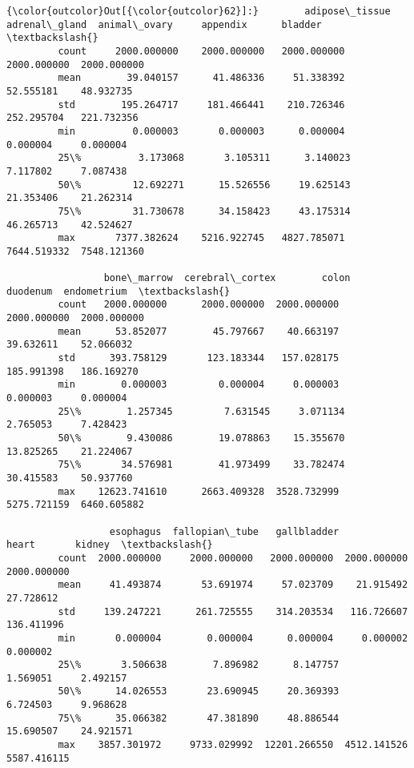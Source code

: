 \documentclass[11pt]{article}
\begin{document}
\begin{Verbatim}[commandchars=\\\{\}]
{\color{outcolor}Out[{\color{outcolor}62}]:}        adipose\_tissue  adrenal\_gland  animal\_ovary     appendix      bladder  \textbackslash{}
         count     2000.000000    2000.000000   2000.000000  2000.000000  2000.000000   
         mean        39.040157      41.486336     51.338392    52.555181    48.932735   
         std        195.264717     181.466441    210.726346   252.295704   221.732356   
         min          0.000003       0.000003      0.000004     0.000004     0.000004   
         25\%          3.173068       3.105311      3.140023     7.117802     7.087438   
         50\%         12.692271      15.526556     19.625143    21.353406    21.262314   
         75\%         31.730678      34.158423     43.175314    46.265713    42.524627   
         max       7377.382624    5216.922745   4827.785071  7644.519332  7548.121360   
         
                 bone\_marrow  cerebral\_cortex        colon     duodenum  endometrium  \textbackslash{}
         count   2000.000000      2000.000000  2000.000000  2000.000000  2000.000000   
         mean      53.852077        45.797667    40.663197    39.632611    52.066032   
         std      393.758129       123.183344   157.028175   185.991398   186.169270   
         min        0.000003         0.000004     0.000003     0.000003     0.000004   
         25\%        1.257345         7.631545     3.071134     2.765053     7.428423   
         50\%        9.430086        19.078863    15.355670    13.825265    21.224067   
         75\%       34.576981        41.973499    33.782474    30.415583    50.937760   
         max    12623.741610      2663.409328  3528.732999  5275.721159  6460.605882   
         
                  esophagus  fallopian\_tube   gallbladder        heart       kidney  \textbackslash{}
         count  2000.000000     2000.000000   2000.000000  2000.000000  2000.000000   
         mean     41.493874       53.691974     57.023709    21.915492    27.728612   
         std     139.247221      261.725555    314.203534   116.726607   136.411996   
         min       0.000004        0.000004      0.000004     0.000002     0.000002   
         25\%       3.506638        7.896982      8.147757     1.569051     2.492157   
         50\%      14.026553       23.690945     20.369393     6.724503     9.968628   
         75\%      35.066382       47.381890     48.886544    15.690507    24.921571   
         max    3857.301972     9733.029992  12201.266550  4512.141526  5587.416115   
         

\end{Verbatim}
\end{document}
